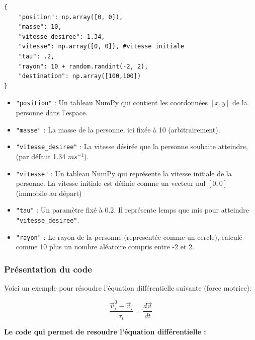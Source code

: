 \documentclass[a4paper,12pt]{article}
\begin{document}
\begin{verbatim}
{
	"position": np.array([0, 0]),
	"masse": 10,
	"vitesse_desiree": 1.34, 
	"vitesse": np.array([0, 0]), #vitesse initiale
	"tau": .2,
	"rayon": 10 + random.randint(-2, 2),
	"destination": np.array([100,100])
} 
\end{verbatim}

\begin{itemize}
    \item \texttt{"position"} : Un tableau NumPy qui contient les coordonnées \([x, y]\) de la personne dans l'espace. 
    
    \item \texttt{"masse"} : La masse de la personne, ici fixée à 10 (arbitrairement).
    
    \item \texttt{"vitesse\_desiree"} : La vitesse désirée que la personne souhaite atteindre, (par défaut 1.34 $ms^{-1}$).
    
    \item \texttt{"vitesse"} : Un tableau NumPy qui représente la vitesse initiale de la personne. La vitesse initiale est définie comme un vecteur nul \([0, 0]\) (immobile au départ)
    
    \item \texttt{"tau"} : Un paramètre fixé à 0.2. Il représente lemps que mis pour atteindre \texttt{"vitesse\_desiree"}.
    
    \item \texttt{"rayon"} : Le rayon de la personne (representée comme un cercle), calculé comme 10 plus un nombre aléatoire compris entre -2 et 2. 
\end{itemize}

\subsubsection{Présentation du code}

Voici un exemple pour résoudre l'équation différentielle suivante (force motrice):

\begin{equation}
\frac{\vec{v}_i^0 - \vec{v}_i}{\tau_i} = \frac{d\vec{v}}{dt}
\end{equation}

\newpage

\textbf{Le code qui permet de resoudre l'équation différentielle :}
\end{document}
